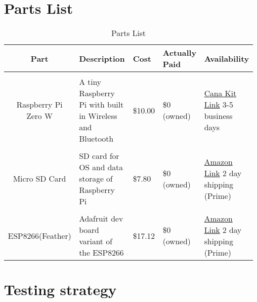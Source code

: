 \documentclass[12pt]{article}
\begin{document}
\section{Parts List}
\begin{table}[H]
    \centering
    \caption{Parts List}
    \label{tab:specs4}
    \begin{tabularx}{\linewidth}{cXXXX} \toprule
        Part & Description & Cost & Actually Paid & Availability\\ \midrule
        \\Raspberry Pi Zero W & A tiny Raspberry Pi with built in Wireless and Bluetooth& \$10.00 & \$0 (owned) & \href{https://www.canakit.com/raspberry-pi-zero-wireless.html?src=raspberrypi}{Cana Kit Link} 3-5 business days\\
        \\Micro SD Card & SD card for OS and data storage of Raspberry Pi& \$7.80 & \$0 (owned) & \href{https://www.amazon.com/SanDisk-Mobile-MicroSDHC-Memory-SDSDQM-B35A/dp/B004ZIENBA/ref=sr\_1\_5?ie=UTF8\&qid=1510058599\&sr=8-5\&keywords=micro+sd+card+8gb\&dpID=41hGPOLym4L\&preST=\_SX300\_QL70\_\&dpSrc=srch}{Amazon Link} 2 day shipping (Prime)\\
        \\ESP8266(Feather) & Adafruit dev board variant of the ESP8266 & \$17.12 & \$0 (owned) & \href{https://www.amazon.com/Adafruit-2821-Feather-HUZZAH-ESP8266/dp/B019MGW6N6/ref=sr\_1\_1\_sspa?ie=UTF8\&qid=1510058499\&sr=8-1-spons\&keywords=adafruit+feather\&psc=1}{Amazon Link} 2 day shipping (Prime)\\
    \end{tabularx}
\end{table}
\section{Testing strategy}
\end{document}
